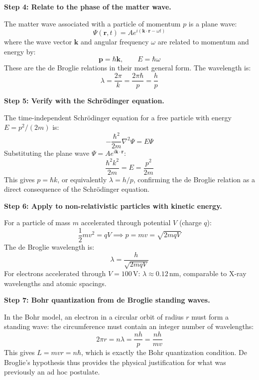 \textbf{Step 4: Relate to the phase of the matter wave.}

The matter wave associated with a particle of momentum $p$ is a plane wave:
\begin{equation}
\Psi(\mathbf{r},t) = Ae^{i(\mathbf{k}\cdot\mathbf{r} - \omega t)}
\end{equation}
where the wave vector $\mathbf{k}$ and angular frequency $\omega$ are related to momentum and energy by:
\begin{equation}
\mathbf{p} = \hbar\mathbf{k}, \qquad E = \hbar\omega
\end{equation}
These are the de Broglie relations in their most general form. The wavelength is:
\begin{equation}
\lambda = \frac{2\pi}{k} = \frac{2\pi\hbar}{p} = \frac{h}{p}
\end{equation}

\textbf{Step 5: Verify with the Schrödinger equation.}

The time-independent Schrödinger equation for a free particle with energy $E = p^2/(2m)$ is:
\begin{equation}
-\frac{\hbar^2}{2m}\nabla^2\Psi = E\Psi
\end{equation}
Substituting the plane wave $\Psi = Ae^{i\mathbf{k}\cdot\mathbf{r}}$:
\begin{equation}
\frac{\hbar^2 k^2}{2m} = E = \frac{p^2}{2m}
\end{equation}
This gives $p = \hbar k$, or equivalently $\lambda = h/p$, confirming the de Broglie relation as a direct consequence of the Schrödinger equation.

\textbf{Step 6: Apply to non-relativistic particles with kinetic energy.}

For a particle of mass $m$ accelerated through potential $V$ (charge $q$):
\begin{equation}
\frac{1}{2}mv^2 = qV \implies p = mv = \sqrt{2mqV}
\end{equation}
The de Broglie wavelength is:
\begin{equation}
\lambda = \frac{h}{\sqrt{2mqV}}
\end{equation}
For electrons accelerated through $V = 100\,\text{V}$: $\lambda \approx 0.12\,\text{nm}$, comparable to X-ray wavelengths and atomic spacings.

\textbf{Step 7: Bohr quantization from de Broglie standing waves.}

In the Bohr model, an electron in a circular orbit of radius $r$ must form a standing wave: the circumference must contain an integer number of wavelengths:
\begin{equation}
2\pi r = n\lambda = \frac{nh}{p} = \frac{nh}{mv}
\end{equation}
This gives $L = mvr = n\hbar$, which is exactly the Bohr quantization condition. De Broglie's hypothesis thus provides the physical justification for what was previously an ad hoc postulate.

